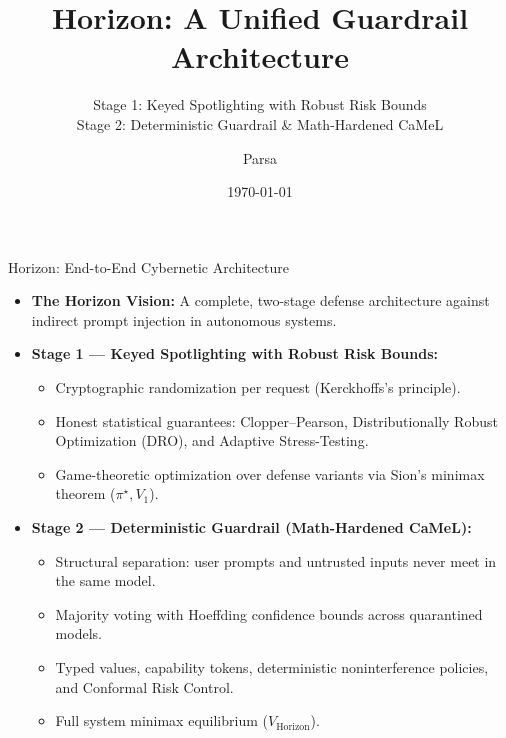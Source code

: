 \documentclass[aspectratio=169,11pt]{beamer}
\title[Horizon: Guardrail Architecture]{\textbf{Horizon: A Unified Guardrail Architecture}}
\subtitle{Stage 1: Keyed Spotlighting with Robust Risk Bounds \\ Stage 2: Deterministic Guardrail \& Math-Hardened CaMeL}
\author{Parsa}
\institute{TU Bergakademie Freiberg}
\date{\today}
\begin{document}
\begin{frame}
  \titlepage
\end{frame}

\begin{frame}{Horizon: End-to-End Cybernetic Architecture}
  \begin{itemize}
    \item \textbf{The Horizon Vision:} A complete, two-stage defense architecture against indirect prompt injection in autonomous systems.
    \item \textbf{Stage 1 --- Keyed Spotlighting with Robust Risk Bounds:}
      \begin{itemize}
        \item Cryptographic randomization per request (Kerckhoffs's principle).
        \item Honest statistical guarantees: Clopper--Pearson, Distributionally Robust Optimization (DRO), and Adaptive Stress-Testing.
        \item Game-theoretic optimization over defense variants via Sion's minimax theorem ($\pi^\star, V_1$).
      \end{itemize}
    \vspace{0.4em}
    \item \textbf{Stage 2 --- Deterministic Guardrail (Math-Hardened CaMeL):}
      \begin{itemize}
        \item Structural separation: user prompts and untrusted inputs never meet in the same model.
        \item Majority voting with Hoeffding confidence bounds across quarantined models.
        \item Typed values, capability tokens, deterministic noninterference policies, and Conformal Risk Control.
        \item Full system minimax equilibrium ($V_\mathrm{Horizon}$).
      \end{itemize}
  \end{itemize}
\end{frame}

\end{document}
